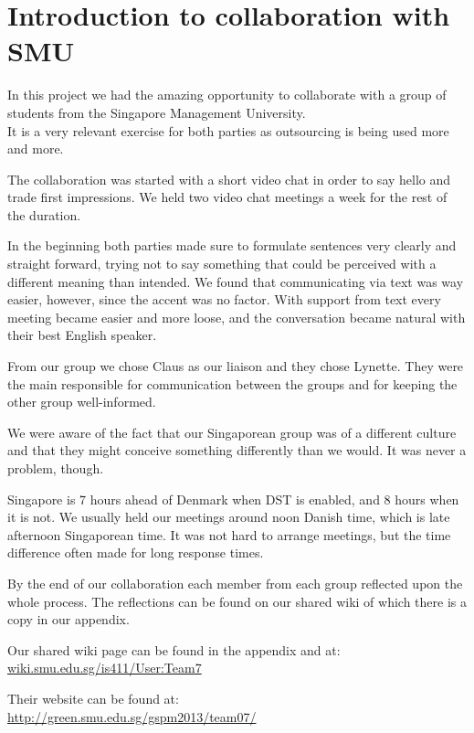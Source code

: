 \section{Introduction to collaboration with SMU}
In this project we had the amazing opportunity to collaborate with a group of students from the Singapore Management University.
\\It is a very relevant exercise for both parties as outsourcing is being used more and more.

The collaboration was started with a short video chat in order to say hello and trade first impressions. We held two video chat meetings a week for the rest of the duration.

In the beginning both parties made sure to formulate sentences very clearly and straight forward, trying not to say something that could be perceived with a different meaning than intended. We found that communicating via text was way easier, however, since the accent was no factor.
With support from text every meeting became easier and more loose, and the conversation became natural with their best English speaker.

From our group we chose Claus as our liaison and they chose Lynette. They were the main responsible for communication between the groups and for keeping the other group well-informed.

We were aware of the fact that our Singaporean group was of a different culture and that they might conceive something differently than we would. It was never a problem, though.

Singapore is 7 hours ahead of Denmark when DST is enabled, and 8 hours when it is not. We usually held our meetings around noon Danish time, which is late afternoon Singaporean time. It was not hard to arrange meetings, but the time difference often made for long response times.

By the end of our collaboration each member from each group reflected upon the whole process. The reflections can be found on our shared wiki of which there is a copy in our appendix.

Our shared wiki page can be found in the appendix and at:
\\\url{wiki.smu.edu.sg/is411/User:Team7}

Their website can be found at:
\\\url{http://green.smu.edu.sg/gspm2013/team07/}
\newpage